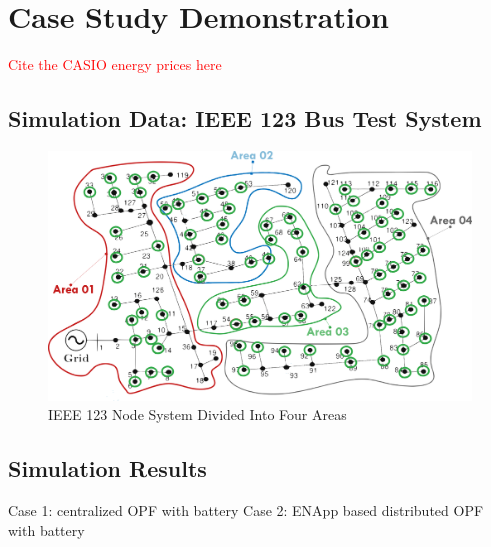 \documentclass[../../outputs/main.tex]{subfiles}
\begin{document}
\section{Case Study Demonstration}

\textcolor{red}{Cite the CASIO energy prices here}
\subsection{Simulation Data: IEEE 123 Bus Test System}

\begin{figure}[h!]
    \centering
    \includegraphics[width=\linewidth]{../figures/ieee123-FourAreas.png}
    \caption{IEEE 123 Node System Divided Into Four Areas}
    \label{fig:ieee123-four-area-figure}
\end{figure}





\subsection{Simulation Results}
Case 1: centralized OPF with battery
Case 2: ENApp based distributed OPF with battery
\end{document}
